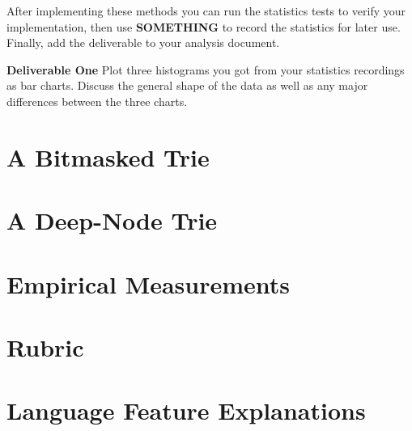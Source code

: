 \documentclass{article}
\begin{document}
After implementing these methods you can run the statistics tests to verify your implementation, then use \textbf{SOMETHING} to record the statistics for later use. Finally, add the deliverable to your analysis document.

\begin{tcolorbox}[colback=infobox, colframe=black, width=\textwidth, boxrule=0.5mm, arc=5mm, auto outer arc]
        \textbf{Deliverable One} Plot three histograms you got from your statistics recordings as bar charts. Discuss the general shape of the data as well as any major differences between the three charts.
\end{tcolorbox}

\section{A Bitmasked Trie}

\section{A Deep-Node Trie}

\section{Empirical Measurements}

\section{Rubric}

\section{Language Feature Explanations}
\end{document}
